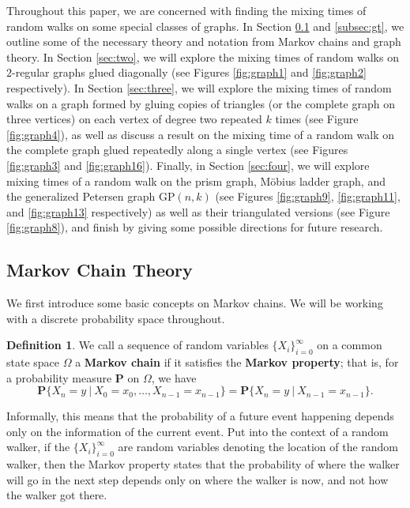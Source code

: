 \documentclass[10pt,a4paper]{amsart}
\theoremstyle{definition}
\newtheorem{definition}{Definition}
\numberwithin{definition}{section}
\begin{document}
Throughout this paper, we are concerned with finding the mixing times of random walks on some special classes of graphs. In Section \ref{subsec:mct} and \ref{subsec:gt}, we outline some of the necessary theory and notation from Markov chains and graph theory. In Section \ref{sec:two}, we will explore the mixing times of random walks on $2$-regular graphs glued diagonally (see Figures \ref{fig:graph1} and \ref{fig:graph2} respectively). In Section \ref{sec:three}, we will explore the mixing times of random walks on a graph formed by gluing copies of triangles (or the complete graph on three vertices) on each vertex of degree two repeated $k$ times (see Figure \ref{fig:graph4}), as well as discuss a result on the mixing time of a random walk on the complete graph glued repeatedly along a single vertex (see Figures \ref{fig:graph3} and \ref{fig:graph16}). Finally, in Section \ref{sec:four}, we will explore mixing times of a random walk on the prism graph, M\"{o}bius ladder graph, and the generalized Petersen graph $\text{GP}(n,k)$ (see Figures \ref{fig:graph9}, \ref{fig:graph11}, and \ref{fig:graph13} respectively) as well as their triangulated versions (see Figure \ref{fig:graph8}), and finish by giving some possible directions for future research. 

\subsection{Markov Chain Theory}\label{subsec:mct}

We first introduce some basic concepts on Markov chains. We will be working with a discrete probability space throughout. 
\begin{definition}
We call a sequence of random variables $\{X_i\}_{i = 0}^{\infty}$ on a common state space $\Omega$ a \textbf{Markov chain} if it satisfies the \textbf{Markov property}; that is, for a probability measure $\mathbf{P}$ on $\Omega$, we have 
\[ \mathbf{P}\{X_n = y \ | \ X_0 = x_0, \ldots,X_{n-1}= x_{n-1}\} = \mathbf{P}\{X_n = y \ | \ X_{n-1} = x_{n-1}\}. \]
\end{definition}
\noindent Informally, this means that the probability of a future event happening depends only on the information of the current event. Put into the context of a random walker, if the $\{X_i\}_{i=0}^{\infty}$ are random variables denoting the location of the random walker, then the Markov property states that the probability of where the walker will go in the next step depends only on where the walker is now, and not how the walker got there. 
\end{document}
